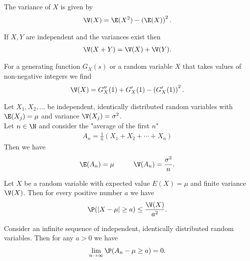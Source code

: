 \documentclass{article}
\begin{document}
\begin{theorem}
    The variance of $X$ is given by
    \begin{align*}
        \V(X) = \E(X^2) - \left(\E(X)\right)^2.
    \end{align*}
\end{theorem}
\begin{theorem}
    If $X,Y$ are independent and the variances exist then
    \begin{align*}
        \V(X+Y) = \V(X) + \V(Y).
    \end{align*}
\end{theorem}
\begin{lemma}
    For a generating function $G_X(s)$ or a random variable
    $X$ that takes values of non-negative integers
    we find
    \begin{align*}
        \V(X) = G''_X(1) + G'_X(1) - \left(G'_X(1)\right)^2.
    \end{align*}
\end{lemma}
\begin{theorem}
    Let $X_1, X_2, ...$ be independent, identically
    distributed random variables with $\E(X_j)=\mu$
    and variance $\V(X_j)=\sigma^2$.\\
    Let $n\in\N$ and consider the "average of the first $n$"
    \begin{align*}
        A_n = \frac{1}{n}\left(X_1 + X_2 + \cdots + X_n\right)
    \end{align*}
    Then we have
    \begin{align*}
        \E(A_n) = \mu\hspace{1cm} \V(A_n) = \frac{\sigma^2}{n}.
    \end{align*}
\end{theorem}
\begin{theorem}
    Let $X$ be a random variable with expected value $E(X)=\mu$
    and finite variance $\V(X)$. Then for every positive number
    $a$ we have
    \begin{align*}
        \P(|X-\mu|\geq a) \leq \frac{\V(X)}{a^2}.
    \end{align*}
\end{theorem}
\begin{theorem}
    Consider an infinite sequence of independent, identically
    distributed random variables. Then for any $a>0$ we have
    \begin{align*}
        \lim_{n\to\infty}\P(A_n - \mu \geq a) = 0.
    \end{align*}
\end{theorem}
\end{document}
